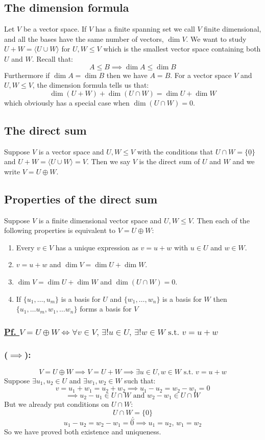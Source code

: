 \documentclass[12pt]{article}
\newcommand{\st}{\text{ s.t. }}
\begin{document}
\subsection*{The dimension formula}
Let \(V\) be a vector space. If \(V\) has a finite spanning set we call \(V\) finite dimensional, and all the bases have the same number of vectors, \(\dim{V}\). We want to study \(U+W=\langle U\cup W\rangle\) for \(U,W\leqslant V\) which is the smallest vector space containing both \(U\) and \(W\). Recall that:
\[A\leqslant B\implies \dim{A}\leq \dim B\]
Furthermore if \(\dim{A}=\dim{B}\) then we have \(A=B\). For a vector space \(V\) and \(U,W\leqslant V\), the dimension formula tells us that:
\[\dim{(U+W)}+\dim{(U\cap W)}=\dim{U}+\dim{W}\]
which obviously has a special case when \(\dim{(U\cap W)}=0\).
\subsection*{The direct sum}
Suppose \(V\) is a vector space and \(U,W\leqslant V\) with the conditions that \(U\cap W=\{\underline{0}\}\) and \(U+W=\langle U\cup W\rangle =V\). Then we say \(V\) is the direct sum of \(U\) and \(W\) and we write \(V=U\oplus W\).
\subsection*{Properties of the direct sum}
Suppose \(V\) is a finite dimensional vector space and \(U,W\leqslant V\). Then each of the following properties is equivalent to \(V=U\oplus W\):
\begin{enumerate}
    \item Every \(v\in V\) has a unique expression as \(v=u+w\) with \(u\in U\) and \(w\in W\).
    \item \(v=u+w\) and \(\dim V=\dim U+\dim W\).
    \item \(\dim V=\dim U+\dim W\) and \(\dim(U\cap W)=0\).
    \item If \(\{u_1,\dots,u_m\}\) is a basis for \(U\) and \(\{w_1,\dots,w_n\}\) is a basis for \(W\) then \(\{u_1,\dots u_m,w_1,\dots w_n\}\) forms a basis for \(V\)
\end{enumerate}
\subsubsection*{\underline{Pf. \(V=U\oplus W\iff \forall v\in V,\,\exists! u\in U,\,\exists!w\in W\st v=u+w\)}}
\subsubsection*{(\(\implies\)):}
\[V=U\oplus W\implies V=U+W\implies \exists u\in U,w\in W\st v=u+w\]
Suppose \(\exists u_1,u_2\in U\) and \(\exists w_1,w_2\in W\) such that:
\[v=u_1+w_1=u_2+w_2\implies u_1-u_2=w_2-w_1=0\]
\[\implies u_2-u_1\in U\cap W \text{ and }w_2-w_1\in U\cap W\]
But we already put conditions on \(U\cap W\):
\[U\cap W=\{0\}\]
\[\therefore\]
\[u_1-u_2=w_2-w_1=0\implies u_1=u_2,\,w_1=w_2\]
So we have proved both existence and uniqueness.
\end{document}
